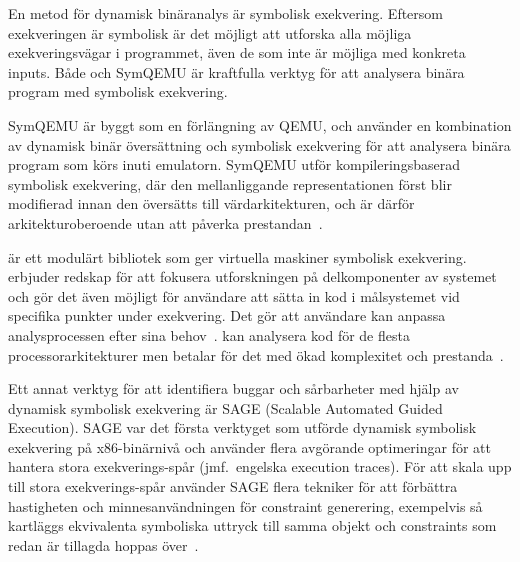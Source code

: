 En metod för dynamisk binäranalys är symbolisk exekvering. Eftersom exekveringen är symbolisk är
det möjligt att utforska alla möjliga exekveringsvägar i programmet, även de som inte är möjliga
med konkreta inputs. Både \stoe{} och SymQEMU är kraftfulla verktyg för att analysera binära program
med symbolisk exekvering.

SymQEMU är byggt som en förlängning av QEMU, och använder en kombination av dynamisk binär
översättning och symbolisk exekvering för att analysera binära program som körs inuti emulatorn.
SymQEMU utför kompileringsbaserad symbolisk exekvering, där den mellanliggande representationen först blir modifierad
innan den översätts till värdarkitekturen, och är därför arkitekturoberoende utan att påverka prestandan~\cite{symqemu}.

\stoe{} är ett modulärt bibliotek som ger virtuella maskiner symbolisk exekvering. \stoe{} erbjuder
redskap för att fokusera utforskningen på delkomponenter av systemet och gör det även
möjligt för användare att sätta in kod i målsystemet vid specifika punkter under
exekvering. Det gör att användare kan anpassa analysprocessen efter sina behov~\cite{s2e}.
\stoe{} kan analysera kod för de flesta processorarkitekturer men betalar för det med ökad
komplexitet och prestanda~\cite{symqemu}.

Ett annat verktyg för att identifiera buggar och sårbarheter med hjälp av dynamisk symbolisk
exekvering är SAGE (Scalable Automated Guided Execution).
SAGE var det första verktyget som utförde dynamisk symbolisk exekvering på x86-binärnivå och använder flera
avgörande optimeringar för att hantera stora exekverings-spår (jmf.\ engelska execution traces).
För att skala upp till stora exekverings-spår använder SAGE flera tekniker för att förbättra hastigheten och
minnesanvändningen för constraint generering, exempelvis så kartläggs ekvivalenta symboliska uttryck till samma
objekt och constraints som redan är tillagda hoppas över~\cite{sage}.
